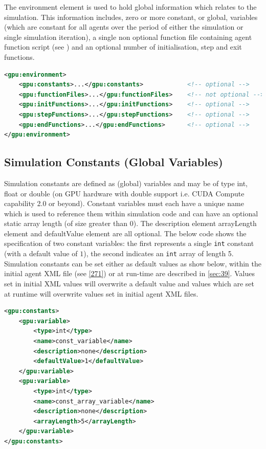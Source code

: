 \documentclass[11pt, a4paper, onecolumn, oneside]{report}
\begin{document}
The environment element is used to hold global information which relates to the simulation.
This information includes, zero or more constant, or global, variables (which are constant for all agents over the period of either the simulation or single simulation iteration), a single non optional function file containing agent function script (see ) and an optional number of initialisation, step and exit functions.


\begin{lstlisting}[language=XML]
<gpu:environment>
    <gpu:constants>...</gpu:constants>            <!-- optional -->
    <gpu:functionFiles>...</gpu:functionFiles>    <!-- not optional -->
    <gpu:initFunctions>...</gpu:initFunctions>    <!-- optional -->
    <gpu:stepFunctions>...</gpu:stepFunctions>    <!-- optional -->
    <gpu:endFunctions>...</gpu:endFunctions>      <!-- optional -->
</gpu:environment>
\end{lstlisting}


\subsection{Simulation Constants (Global Variables)}
\label{sec:221}

Simulation constants are defined as (global) variables and may be of type int, float or double (on GPU hardware with double support i.e. CUDA Compute capability 2.0 or beyond).
Constant variables must each have a unique name which is used to reference them within simulation code and can have an optional static array length (of size greater than 0).
The description element arrayLength element and defaultValue element are all optional.
The below code shows the specification of two constant variables: the first represents a single \texttt{int} constant (with a default value of $1$), the second indicates an \texttt{int} array of length 5.
Simulation constants can be set either as default values as show below, within the initial agent XML file (see \cref{271}) or at run-time are described in \cref{sec:39}. Values set in initial XML values will overwrite a default value and values which are set at runtime will overwrite values set in initial agent XML files.


\begin{lstlisting}[language=XML]
<gpu:constants>
    <gpu:variable>
        <type>int</type>
        <name>const_variable</name>
        <description>none</description>
        <defaultValue>1</defaultValue>
    </gpu:variable>
    <gpu:variable>
        <type>int</type>
        <name>const_array_variable</name>
        <description>none</description>
        <arrayLength>5</arrayLength>
    </gpu:variable>
</gpu:constants>
\end{lstlisting}
\end{document}
